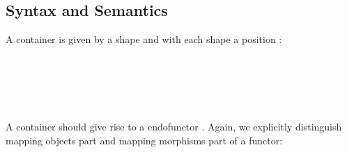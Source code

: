 \subsection{Syntax and Semantics}

A container is given by a shape  and with each shape a position :

\begin{code}%
\>[0]\AgdaSpace{}%
\AgdaSpace{}%
\AgdaSymbol{:}\AgdaSpace{}%
\AgdaSpace{}%
\<%
\\
\>[0][@{}l@{\AgdaIndent{0}}]%
\>[2]\AgdaSpace{}%
\<%
\\
%
\>[2]\<%
\\
\>[2][@{}l@{\AgdaIndent{0}}]%
\>[4]\AgdaSpace{}%
\AgdaSymbol{:}\AgdaSpace{}%
\<%
\\
%
\>[4]\AgdaSpace{}%
\AgdaSymbol{:}\AgdaSpace{}%
\AgdaSpace{}%
\AgdaSpace{}%
\<%
\end{code}

\begin{code}[hide]%
\>[0]\AgdaSpace{}%
\AgdaSpace{}%
\AgdaSpace{}%
\AgdaSymbol{:}\AgdaSpace{}%
\<%
\end{code}

A container should give rise to a endofunctor   . Again, we explicitly distinguish mapping objects part and mapping morphisms part of a functor:

